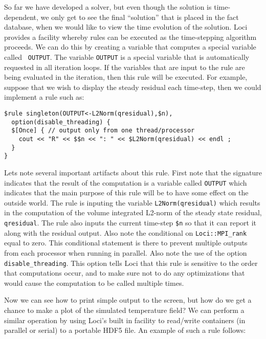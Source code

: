 \documentclass[10pt,epsf,letterpaper,twoside]{book}
\begin{document}
So far we have developed a solver, but even though the solution is
time-dependent, we only get to see the final ``solution'' that is
placed in the fact database, when we would like to view the time
evolution of the solution.  Loci provides a facility whereby rules can
be executed as the time-stepping algorithm proceeds.  We can do this
by creating a variable that computes a special variable called {\tt
  OUTPUT}.  The variable {\tt OUTPUT} is a special variable that is
automatically requested in all iteration loops.  If the variables that
are input to the rule are being evaluated in the iteration, then this
rule will be executed.  For example, suppose that we wish to display
the steady residual each time-step, then we could implement a rule such
as:
\begin{verbatim}
$rule singleton(OUTPUT<-L2Norm(qresidual),$n),
  option(disable_threading) {
  $[Once] { // output only from one thread/processor
    cout << "R" << $$n << ": " << $L2Norm(qresidual) << endl ;
  }
}
\end{verbatim}
Lets note several important artifacts about this rule.  First note
that the signature indicates that the result of the computation is a
variable called {\tt OUTPUT} which indicates that the main purpose of
this rule will be to have some effect on the outside world. The rule
is inputing the variable {\tt L2Norm(qresidual)} which results in the
computation of the volume integrated L2-norm of the steady state
residual, {\tt qresidual}.  The rule also inputs the current time-step
{\tt \$n} so that it can report it along with the residual output.
Also note the conditional on {\tt Loci::MPI\_rank} equal to zero.
This conditional statement is there to prevent multiple outputs from
each processor when running in parallel.  Also note the use of the
option {\tt disable\_threading}.  This option tells Loci that this
rule is sensitive to the order that computations occur, and to make
sure not to do any optimizations that would cause the computation to
be called multiple times.

Now we can see how to print simple output to the screen, but how do we
get a chance to make a plot of the simulated temperature field?  We
can perform a similar operation by using Loci's built in facility to
read/write containers (in parallel or serial) to a portable HDF5 file.
An example of such a rule follows:
\end{document}
